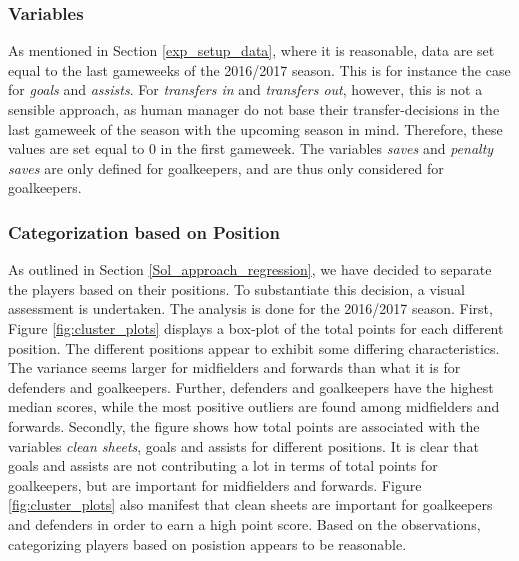 \subsubsection{Variables}

As mentioned in Section \ref{exp_setup_data}, where it is reasonable, data are set equal to the last gameweeks of the 2016/2017 season. This is for instance the case for \textit{goals} and \textit{assists}. For \textit{transfers in} and \textit{transfers out}, however, this is not a sensible approach, as human manager do not base their transfer-decisions in the last gameweek of the season with the upcoming season in mind. Therefore, these values are set equal to 0 in the first gameweek. The variables \textit{saves} and \textit{penalty saves} are only defined for goalkeepers, and are thus only considered for goalkeepers.

\subsubsection{Categorization based on Position}

As outlined in Section \ref{Sol_approach_regression}, we have decided to separate the players based on their positions. To substantiate this decision, a visual assessment is undertaken. The analysis is done for the 2016/2017 season. First, Figure \ref{fig:cluster_plots} displays a box-plot of the total points for each different position. The different positions appear to exhibit some differing characteristics. The variance seems larger for midfielders and forwards than what it is for defenders and goalkeepers. Further, defenders and goalkeepers have the highest median scores, while the most positive outliers are found among midfielders and forwards. Secondly, the figure shows how total points are associated with the variables \textit{clean sheets}, goals and assists for different positions. It is clear that goals and assists are not contributing a lot in terms of total points for goalkeepers, but are important for midfielders and forwards. Figure \ref{fig:cluster_plots} also manifest that clean sheets are important for goalkeepers and defenders in order to earn a high point score. Based on the observations, categorizing players based on posistion appears to be reasonable.

